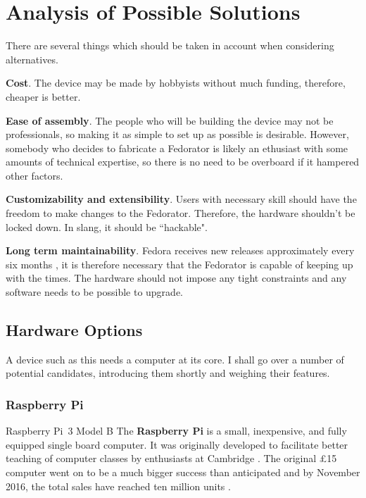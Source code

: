 \chapter{Analysis of Possible Solutions}
    There are several things which should be taken in account when considering alternatives.
    
    \textbf{Cost}.  The device may be made by hobbyists without much funding, therefore, cheaper is better.
    
    \textbf{Ease of assembly}.  The people who will be building the device may not be professionals, so making it as simple to set up as possible is desirable.  However, somebody who decides to fabricate a Fedorator is likely an ethusiast with some amounts of technical expertise, so there is no need to be overboard if it hampered other factors.
    
    \textbf{Customizability and extensibility}.  Users with necessary skill should have the freedom to make changes to the Fedorator.  Therefore, the hardware shouldn't be locked down.  In slang, it should be ``hackable".
    
    \textbf{Long term maintainability}.  Fedora receives new releases approximately every six months \cite{fedora-release-life-cycle}, it is therefore necessary that the Fedorator is capable of keeping up with the times.  The hardware should not impose any tight constraints and any software needs to be possible to upgrade.
    
    \section{Hardware Options}
        A device such as this needs a computer at its core.  I shall go over a number of potential candidates, introducing them shortly and weighing their features.
        \subsection{Raspberry Pi}
                {Raspberry Pi~3 Model B  \cite{rpi-pimoroni}}
            The \textbf{Raspberry Pi} is a small, inexpensive, and fully equipped single board computer.  It was originally developed to facilitate better teaching of computer classes by enthusiasts at Cambridge \cite{bbc-15-pound-computer}.  The original £15 computer went on to be a much bigger success than anticipated and by November 2016, the total sales have reached ten million units \cite{rpi-ten-million}.
            
